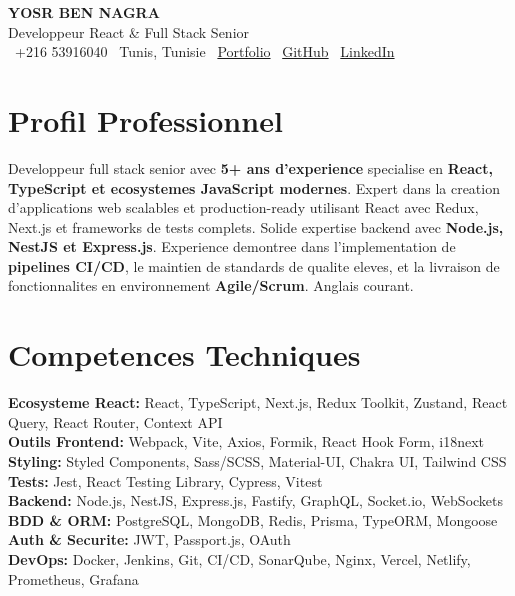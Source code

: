 \documentclass[10pt,a4paper]{article}
\begin{document}
\begin{center}
  {\Large\bfseries\color{primary} YOSR BEN NAGRA}\\[2pt]
  {\small\color{darkgray} Developpeur React \& Full Stack Senior}\\[3pt]
  {\footnotesize
    \faPhone\ +216 53916040 \quad
    \faMapMarker*\ Tunis, Tunisie \quad
    \faGlobe\ \href{https://portfolio-yosr.vercel.app/en}{Portfolio} \quad
    \faGithub\ \href{https://github.com/YosrBennagra}{GitHub} \quad
    \faLinkedin\ \href{https://www.linkedin.com/in/yosr-ben-nagra/}{LinkedIn}
  }
\end{center}

\vspace{3pt}

\section*{Profil Professionnel}
\vspace{1pt}
{\small
Developpeur full stack senior avec \textbf{5+ ans d'experience} specialise en \textbf{React, TypeScript et ecosystemes JavaScript modernes}. Expert dans la creation d'applications web scalables et production-ready utilisant React avec Redux, Next.js et frameworks de tests complets. Solide expertise backend avec \textbf{Node.js, NestJS et Express.js}. Experience demontree dans l'implementation de \textbf{pipelines CI/CD}, le maintien de standards de qualite eleves, et la livraison de fonctionnalites en environnement \textbf{Agile/Scrum}. Anglais courant.
}

\vspace{5pt}

\section*{Competences Techniques}
\vspace{2pt}
{\small
\textbf{Ecosysteme React:} React, TypeScript, Next.js, Redux Toolkit, Zustand, React Query, React Router, Context API\\[2pt]
\textbf{Outils Frontend:} Webpack, Vite, Axios, Formik, React Hook Form, i18next\\[2pt]
\textbf{Styling:} Styled Components, Sass/SCSS, Material-UI, Chakra UI, Tailwind CSS\\[2pt]
\textbf{Tests:} Jest, React Testing Library, Cypress, Vitest\\[2pt]
\textbf{Backend:} Node.js, NestJS, Express.js, Fastify, GraphQL, Socket.io, WebSockets\\[2pt]
\textbf{BDD \& ORM:} PostgreSQL, MongoDB, Redis, Prisma, TypeORM, Mongoose\\[2pt]
\textbf{Auth \& Securite:} JWT, Passport.js, OAuth\\[2pt]
\textbf{DevOps:} Docker, Jenkins, Git, CI/CD, SonarQube, Nginx, Vercel, Netlify, Prometheus, Grafana
}
\end{document}
